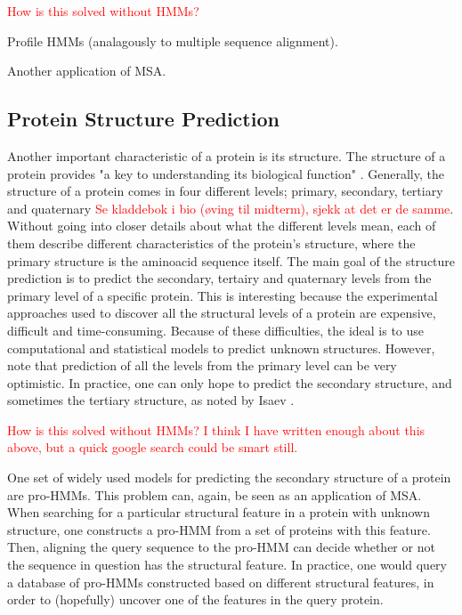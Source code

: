 \documentclass{article}\usepackage[]{graphicx}\usepackage[]{color}
\begin{document}
\textcolor{red}{How is this solved without HMMs?}

Profile HMMs (analagously to multiple sequence alignment). 

Another application of MSA.

\subsection{Protein Structure Prediction}\label{Section:ProtStructurePred}
Another important characteristic of a protein is its structure. The structure of a protein provides "a key to understanding its biological function" \cite{Isaev2006}. Generally, the structure of a protein comes in four different levels; primary, secondary, tertiary and quaternary \textcolor{red}{Se kladdebok i bio (øving til midterm), sjekk at det er de samme}. Without going into closer details about what the different levels mean, each of them describe different characteristics of the protein's structure, where the primary structure is the aminoacid sequence itself. The main goal of the structure prediction is to predict the secondary, tertairy and quaternary levels from the primary level of a specific protein. This is interesting because the experimental approaches used to discover all the structural levels of a protein are expensive, difficult and time-consuming. Because of these difficulties, the ideal is to use computational and statistical models to predict unknown structures. However, note that prediction of all the levels from the primary level can be very optimistic. In practice, one can only hope to predict the secondary structure, and sometimes the tertiary structure, as noted by Isaev \cite{Isaev2006}.

\textcolor{red}{How is this solved without HMMs? I think I have written enough about this above, but a quick google search could be smart still.}

One set of widely used models for predicting the secondary structure of a protein are pro-HMMs. This problem can, again, be seen as an application of MSA. When searching for a particular structural feature in a protein with unknown structure, one constructs a pro-HMM from a set of proteins with this feature. Then, aligning the query sequence to the pro-HMM can decide whether or not the sequence in question has the structural feature. In practice, one would query a database of pro-HMMs constructed based on different structural features, in order to (hopefully) uncover one of the features in the query protein.  
\end{document}
